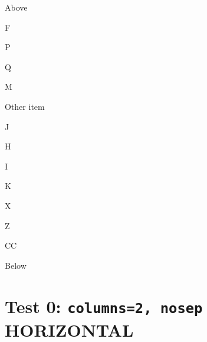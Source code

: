 \documentclass[12pt]{article}
\begin{document}
Above
\begin{enumext}[columns=2]%
\item F

  \begin{enumext}%
     \item P \item Q \item M
  \end{enumext}
\item Other item

\columnbreak

\item J

  \begin{enumext}[columns=2]%
     \item  H \item I \item K
     \columnbreak
     \item X \item Z
  \end{enumext}
\item CC
\end{enumext}
Below



\section{Test 0: \texttt{columns=2, nosep} HORIZONTAL}
\end{document}
